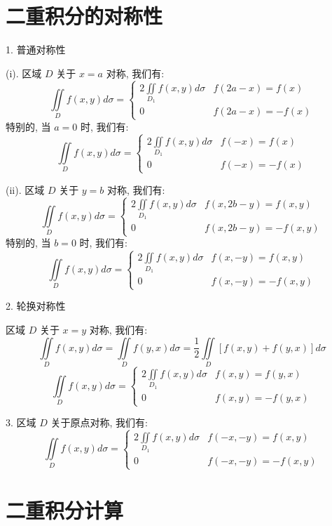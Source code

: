 \section{二重积分的对称性}

\begin{theorem}[对称性]
	1. 普通对称性

	(i). 区域 $D$ 关于 $x = a$ 对称, 我们有:
	$$\iint\limits_{D} f(x,y)d\sigma = \begin{cases} 2\iint\limits_{D_{1}} f(x,y)d\sigma & f(2a-x) = f(x) \\ 0 & f(2a-x) = -f(x)  \end{cases}$$
	特别的, 当 $a = 0$ 时, 我们有:
	$$\iint\limits_{D} f(x,y)d\sigma = \begin{cases} 2\iint\limits_{D_{1}} f(x,y)d\sigma & f(-x) = f(x) \\ 0 & f(-x) = -f(x)  \end{cases}$$

	(ii). 区域 $D$ 关于 $y = b$ 对称, 我们有:
	$$\iint\limits_{D} f(x,y)d\sigma = \begin{cases} 2\iint\limits_{D_{1}} f(x,y)d\sigma & f(x,2b-y) = f(x,y) \\ 0 & f(x,2b-y) = -f(x,y)  \end{cases}$$
	特别的, 当 $b = 0$ 时, 我们有:
	$$\iint\limits_{D} f(x,y)d\sigma = \begin{cases} 2\iint\limits_{D_{1}} f(x,y)d\sigma & f(x,-y) = f(x,y) \\ 0 & f(x,-y) = -f(x,y)  \end{cases}$$

	2. 轮换对称性

	区域 $D$ 关于 $x = y$ 对称, 我们有:
	$$\iint\limits_{D} f(x,y)d\sigma = \iint\limits_{D} f(y,x)d\sigma= \dfrac{1}{2}\iint\limits_{D}\left[f(x,y)+f(y,x)\right]d\sigma$$
	$$\iint\limits_{D} f(x,y)d\sigma = \begin{cases} 2\iint\limits_{D_{1}} f(x,y)d\sigma & f(x,y) = f(y,x) \\ 0 & f(x,y) = -f(y,x)  \end{cases}$$

	3. 区域 $D$ 关于原点对称, 我们有:
	$$\iint\limits_{D} f(x,y)d\sigma = \begin{cases} 2\iint\limits_{D_{1}} f(x,y)d\sigma & f(-x,-y) = f(x,y) \\ 0 & f(-x,-y) = -f(x,y)  \end{cases}$$
\end{theorem}
\section{二重积分计算}

